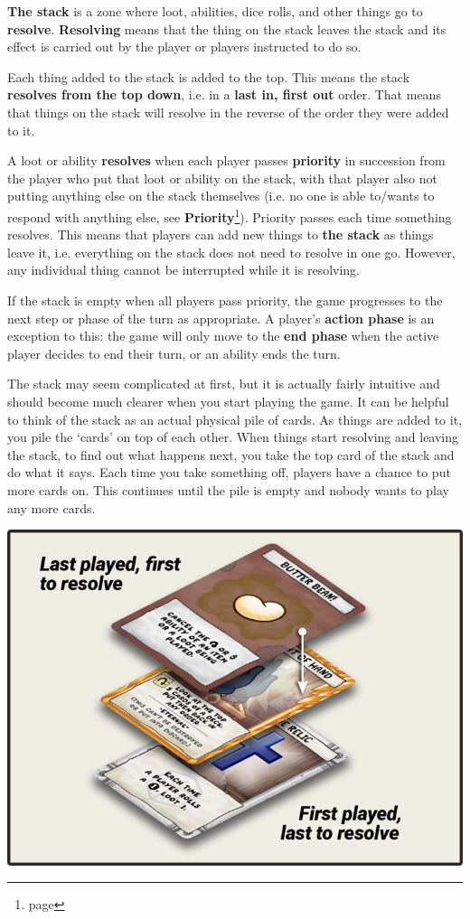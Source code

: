\documentclass[a4paper, twoside]{report} %
\begin{document}
    \textbf{The stack} is a zone where loot, abilities, dice rolls, and other things go to \textbf{resolve}. \textbf{Resolving} means that the thing on the stack leaves the stack and its effect is carried out by the player or players instructed to do so.

    Each thing added to the stack is added to the top. This means the stack \textbf{resolves from the top down}, i.e. in a \textbf{last in, first out} order. That means that things on the stack will resolve in the reverse of the order they were added to it.

    A loot or ability \textbf{resolves} when each player passes \textbf{priority} in succession from the player who put that loot or ability on the stack, with that player also not putting anything else on the stack themselves (i.e. no one is able to/wants to respond with anything else, see \textbf{Priority}\footnote{page \pageref{priority}}). Priority passes each time something resolves. This means that players can add new things to \textbf{the stack} as things leave it, i.e. everything on the stack does not need to resolve in one go. However, any individual thing cannot be interrupted while it is resolving.

    If the stack is empty when all players pass priority, the game progresses to the next step or phase of the turn as appropriate. A player’s \textbf{action phase} is an exception to this: the game will only move to the \textbf{end phase} when the active player decides to end their turn, or an ability ends the turn.

    The stack may seem complicated at first, but it is actually fairly intuitive and should become much clearer when you start playing the game. It can be helpful to think of the stack as an actual physical pile of cards. As things are added to it, you pile the ‘cards’ on top of each other. When things start resolving and leaving the stack, to find out what happens next, you take the top card of the stack and do what it says. Each time you take something off, players have a chance to put more cards on. This continues until the pile is empty and nobody wants to play any more cards.

    \includegraphics[width=\textwidth]{assets/Stack-Example-768x566.png}
    
\end{document}
